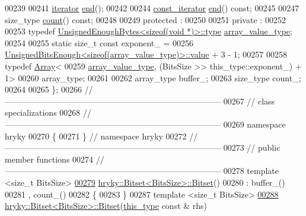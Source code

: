 \begin{DoxyCode}
00239 
00241     \hyperlink{classhryky_1_1iterator_1_1random_1_1_mutable}{iterator} \hyperlink{classhryky_1_1_bitset_a1b66eeafa0a16b7bd4b7914421b59c60}{end}();
00242 
00244     \hyperlink{classhryky_1_1iterator_1_1random_1_1_immutable}{const_iterator} \hyperlink{classhryky_1_1_bitset_a1b66eeafa0a16b7bd4b7914421b59c60}{end}() \textcolor{keyword}{const};
00245 
00247     size\_type \hyperlink{classhryky_1_1_bitset_a20d189bc95da6a2aef278b8ab953d667}{count}() \textcolor{keyword}{const};
00248 
00249 \textcolor{keyword}{protected} :
00250 
00251 \textcolor{keyword}{private} :
00252 
00253     \textcolor{keyword}{typedef} \hyperlink{classhryky_1_1_unsigned_enough_exponent}{UnsignedEnoughBytes<sizeof(void *)>::type} \hyperlink{classhryky_1_1_unsigned_enough_exponent}{array_value_type};
00254 
00255     \textcolor{keyword}{static} \textcolor{keywordtype}{size\_t} \textcolor{keyword}{const} exponent\_ =
00256         \hyperlink{classhryky_1_1_unsigned_bits_enough}{UnsignedBitsEnough<sizeof(array_value_type)>::value} + 3 - 1;
00257 
00258     \textcolor{keyword}{typedef} \hyperlink{classhryky_1_1_array}{Array}<
00259         \hyperlink{classhryky_1_1_unsigned_enough_exponent}{array_value_type}, (BitsSize >> this\_type::exponent\_) + 1>
00260             array\_type;
00261 
00262     array\_type  buffer\_;
00263     size\_type   count\_;
00264 
00265 \};
00266 \textcolor{comment}{//
      ------------------------------------------------------------------------------}
00267 \textcolor{comment}{// class specializations}
00268 \textcolor{comment}{//
      ------------------------------------------------------------------------------}
00269 \textcolor{keyword}{namespace }hryky
00270 \{
00271 \} \textcolor{comment}{// namespace hryky}
00272 \textcolor{comment}{//
      ------------------------------------------------------------------------------}
00273 \textcolor{comment}{// public member functions}
00274 \textcolor{comment}{//
      ------------------------------------------------------------------------------}
00278 \textcolor{comment}{}\textcolor{keyword}{template} <\textcolor{keywordtype}{size\_t} BitsSize>
\hypertarget{bitset_8h_source_l00279}{}\hyperlink{classhryky_1_1_bitset_a28b1c686a006ded6ee81b0d3ea38d608}{00279} \hyperlink{classhryky_1_1_bitset_a28b1c686a006ded6ee81b0d3ea38d608}{hryky::Bitset<BitsSize>::Bitset}()
00280     : buffer\_()
00281       , count\_()
00282 \{
00283 \}
00287 \textcolor{keyword}{template} <\textcolor{keywordtype}{size\_t} BitsSize>
\hypertarget{bitset_8h_source_l00288}{}\hyperlink{classhryky_1_1_bitset_ad183b186df75c98112608fe40d70a986}{00288} \hyperlink{classhryky_1_1_bitset}{hryky::Bitset<BitsSize>::Bitset}(\hyperlink{classhryky_1_1_bitset}{this_type} \textcolor{keyword}{const} & rhs)

\end{DoxyCode}

